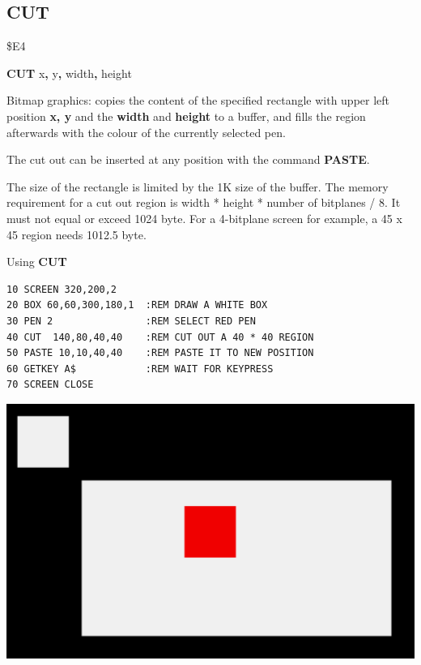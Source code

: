 \subsection{CUT}
\begin{description}[leftmargin=2cm,style=nextline]
\item [Token:] \$E4
\item [Format:] {\bf CUT} x{\bf,} y{\bf,} width{\bf,} height
\item [Usage:] Bitmap graphics: copies the content
               of the specified rectangle
               with upper left position {\bf x, y} and the {\bf width}
               and {\bf height} to a buffer, and fills the region
               afterwards with the colour of the currently selected pen.

               The cut out can be inserted at any position with the
               command {\bf PASTE}.

\item [Remarks:] The size of the rectangle is limited by the 1K size of
                 the buffer. The memory requirement for
                 a cut out region is width * height * number of bitplanes / 8.
                 It must not equal or exceed 1024 byte.
                 For a 4-bitplane screen for example, a 45 x 45 region
                 needs 1012.5 byte.

\item [Example:] Using {\bf CUT}
\begin{tcolorbox}[colback=black,coltext=white]
\verbatimfont{\codefont}
\begin{verbatim}
10 SCREEN 320,200,2
20 BOX 60,60,300,180,1  :REM DRAW A WHITE BOX
30 PEN 2                :REM SELECT RED PEN
40 CUT  140,80,40,40    :REM CUT OUT A 40 * 40 REGION
50 PASTE 10,10,40,40    :REM PASTE IT TO NEW POSITION
60 GETKEY A$            :REM WAIT FOR KEYPRESS
70 SCREEN CLOSE
\end{verbatim}
\end{tcolorbox}
\item \begin{center}\includegraphics[width=0.7\linewidth]{images/cut.png}\end{center}
\end{description}

